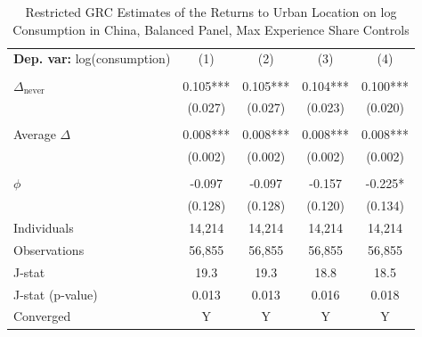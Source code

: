 \begin{table}[htbp] \centering \begin{threeparttable}
 \caption{Restricted GRC Estimates of the Returns to Urban Location on log Consumption in China, Balanced Panel, Max Experience Share Controls} 
 \label{tab:GRC_CHN_consumption_urban_bal_exp_m_sh} 
\begin{tabular}{l cccc} \toprule  \textbf{Dep. var:}  log(consumption) 
                    &\multicolumn{1}{c}{(1)}   &\multicolumn{1}{c}{(2)}   &\multicolumn{1}{c}{(3)}   &\multicolumn{1}{c}{(4)}   \\
                    &               &               &               &               \\
\addlinespace
$\Delta_{\text{never}}$&       0.105***&       0.105***&       0.104***&       0.100***\\
                    &     (0.027)   &     (0.027)   &     (0.023)   &     (0.020)   \\
                    &               &               &               &               \\
\addlinespace
Average $\Delta$    &       0.008***&       0.008***&       0.008***&       0.008***\\
                    &     (0.002)   &     (0.002)   &     (0.002)   &     (0.002)   \\
                    &               &               &               &               \\
\addlinespace
$\phi$              &      -0.097   &      -0.097   &      -0.157   &      -0.225*  \\
                    &     (0.128)   &     (0.128)   &     (0.120)   &     (0.134)   \\
\addlinespace
Individuals         &      14,214   &      14,214   &      14,214   &      14,214   \\
Observations        &      56,855   &      56,855   &      56,855   &      56,855   \\
J-stat              &        19.3   &        19.3   &        18.8   &        18.5   \\
J-stat (p-value)    &       0.013   &       0.013   &       0.016   &       0.018   \\
Converged           &           Y   &           Y   &           Y   &           Y   \\

\end{tabular}
\end{threeparttable}
\end{table}
